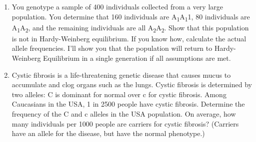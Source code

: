\documentclass[11pt]{article}
\begin{document}
\begin{enumerate}
\newpage

\item You genotype a sample of 400 individuals collected from a very large population.  You determine that 160 individuals are A\textsubscript{1}A\textsubscript{1}1, 80 individuals are A\textsubscript{1}A\textsubscript{2}, and the remaining individuals are all A\textsubscript{2}A\textsubscript{2}.  Show that this population is not in Hardy-Weinberg equilibrium. If you know how, calculate the actual allele frequencies. I'll show you that the population will return to Hardy-Weinberg Equilibrium in a single generation if all assumptions are met. \vspace{3.5in}

\item Cystic fibrosis is a life-threatening genetic disease that causes mucus to accumulate and clog organs such as the lungs. Cystic fibrosis is determined by two alleles: C is dominant for normal over c for cystic fibrosis. Among Caucasians in the USA, 1 in 2500 people have cystic fibrosis.  Determine the frequency of the C and c alleles in the USA population.  On average, how many individuals per 1000 people are carriers for cystic fibrosis? (Carriers have an allele for the disease, but have the normal phenotype.)

\end{enumerate}
\end{document}
